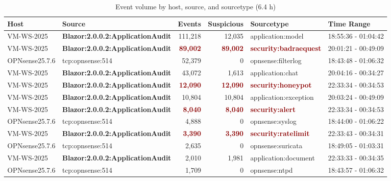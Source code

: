 
\begin{table}[hbtp]
\caption{Event volume by host, source, and sourcetype (6.4 h)}
\label{tab:export_22Dec2025_010633_volume}
\centering
\scriptsize
\begin{tabular}{|l|l|r|r|l|l|}
\hline
\textbf{Host} & \textbf{Source} & \textbf{Events} & \textbf{Suspicious} & \textbf{Sourcetype} & \textbf{Time Range} \\
\hline
VM-WS-2025 & \textbf{Blazor:2.0.0.2:ApplicationAudit} & 111,218 & 12,035 & application:model & 18:55:36 - 01:04:42 \\
VM-WS-2025 & \textbf{Blazor:2.0.0.2:ApplicationAudit} & \textcolor{darkred}{\textbf{89,002}} & \textcolor{darkred}{\textbf{89,002}} & \textcolor{darkred}{\textbf{security:badraequest}} & 20:01:21 - 00:49:09 \\
OPNsense25.7.6 & tcp:opnsense:514 & 52,379 & 0 & opnsense:filterlog & 18:43:48 - 01:06:32 \\
VM-WS-2025 & \textbf{Blazor:2.0.0.2:ApplicationAudit} & 43,072 & 1,613 & application:chat & 20:04:16 - 00:34:27 \\
VM-WS-2025 & \textbf{Blazor:2.0.0.2:ApplicationAudit} & \textcolor{darkred}{\textbf{12,090}} & \textcolor{darkred}{\textbf{12,090}} & \textcolor{darkred}{\textbf{security:honeypot}} & 22:33:34 - 00:34:53 \\
VM-WS-2025 & \textbf{Blazor:2.0.0.2:ApplicationAudit} & 10,804 & 10,804 & application:exception & 20:03:24 - 00:49:09 \\
VM-WS-2025 & \textbf{Blazor:2.0.0.2:ApplicationAudit} & \textcolor{darkred}{\textbf{8,040}} & \textcolor{darkred}{\textbf{8,040}} & \textcolor{darkred}{\textbf{security:alert}} & 22:33:34 - 00:34:53 \\
OPNsense25.7.6 & tcp:opnsense:514 & 4,888 & 0 & opnsense:syslog & 18:44:00 - 01:06:22 \\
VM-WS-2025 & \textbf{Blazor:2.0.0.2:ApplicationAudit} & \textcolor{darkred}{\textbf{3,390}} & \textcolor{darkred}{\textbf{3,390}} & \textcolor{darkred}{\textbf{security:ratelimit}} & 22:33:43 - 00:34:31 \\
OPNsense25.7.6 & tcp:opnsense:514 & 2,635 & 0 & opnsense:suricata & 18:49:05 - 01:03:31 \\
VM-WS-2025 & \textbf{Blazor:2.0.0.2:ApplicationAudit} & 2,010 & 1,981 & application:document & 22:33:33 - 00:34:35 \\
OPNsense25.7.6 & tcp:opnsense:514 & 1,709 & 0 & opnsense:ntpd & 18:43:57 - 01:06:32 \\

\end{tabular}
\end{table}
